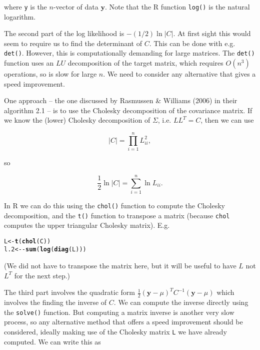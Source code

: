 \documentclass[a4paper, 11pt, amsmath, graphicx]{article}\usepackage[]{graphicx}\usepackage[]{color}
\makeatletter
\newcommand{\hlopt}[1]{\textcolor[rgb]{0,0,0}{#1}}%
\newcommand{\hlstd}[1]{\textcolor[rgb]{0.345,0.345,0.345}{#1}}%
\newcommand{\hlkwb}[1]{\textcolor[rgb]{0.69,0.353,0.396}{#1}}%
\newcommand{\hlkwd}[1]{\textcolor[rgb]{0.737,0.353,0.396}{\textbf{#1}}}%
\newenvironment{kframe}{%
 \def\at@end@of@kframe{}%
 \ifinner\ifhmode%
  \def\at@end@of@kframe{\end{minipage}}%
  \begin{minipage}{\columnwidth}%
 \fi\fi%
 \def\FrameCommand##1{\hskip\@totalleftmargin \hskip-\fboxsep
 \colorbox{shadecolor}{##1}\hskip-\fboxsep
     \hskip-\linewidth \hskip-\@totalleftmargin \hskip\columnwidth}%
 \MakeFramed {\advance\hsize-\width
   \@totalleftmargin\z@ \linewidth\hsize
   \@setminipage}}%
 {\par\unskip\endMakeFramed%
 \at@end@of@kframe}
\newenvironment{knitrout}{}{} %
\makeatother
\begin{document}
where {\tt y} is the $n$-vector of data $\mathbf{y}$. Note that the R function {\tt log()} is the natural logarithm. 

The second part of the log likelihood is $- (1/2) \ln |C|$. At first sight this would seem to require us to find  the determinant of $C$. This can be done with e.g. {\tt det()}. However, this is computationally demanding for large matrices. The {\tt det()} function uses an $LU$ decomposition of the target matrix, which requires $O(n^3)$ operations, so is slow for large $n$. We need to consider any alternative that gives a speed improvement.

One approach -- the one discussed by Rasmussen \& Williams (2006) in their algorithm 2.1 -- is to use the Cholesky decomposition of the covariance matrix. If we know the (lower) Cholesky decomposition of $\Sigma$, i.e. $LL^T = C$, then we can use

\begin{equation}
  |C| = \prod_{i=1}^{n} L_{ii}^2,
\end{equation}

so

\begin{equation}
  \frac{1}{2} \ln |C| = \sum_{i=1}^{n} \ln L_{ii}.
\end{equation}

In R we can do this using the {\tt chol()} function to compute the Cholesky decomposition, and the {\tt t()} function to transpose a matrix (because {\tt chol} computes the upper triangular Cholesky matrix). E.g.

\begin{knitrout}
\color{fgcolor}\begin{kframe}
\begin{alltt}
  \hlstd{L} \hlkwb{<-} \hlkwd{t}\hlstd{(} \hlkwd{chol}\hlstd{(C) )}
  \hlstd{l.2} \hlkwb{<-} \hlopt{-}\hlkwd{sum}\hlstd{(} \hlkwd{log}\hlstd{(} \hlkwd{diag}\hlstd{(L) ) )}
\end{alltt}
\end{kframe}
\end{knitrout}

(We did not have to transpose the matrix here, but it will be useful to have $L$ not $L^T$ for the next step.)

The third part involves the quadratic form $\frac{1}{2} (\mathbf{y} - \mu)^T C^{-1} (\mathbf{y} - \mu)$ which involves the finding the inverse of $C$. We can compute the inverse directly using the {\tt solve()} function. But computing a matrix inverse is another very slow process, so any alternative method that offers a speed improvement should be considered, ideally making use of the Cholesky matrix {\tt L} we have already computed. We can write this as 
\end{document}
